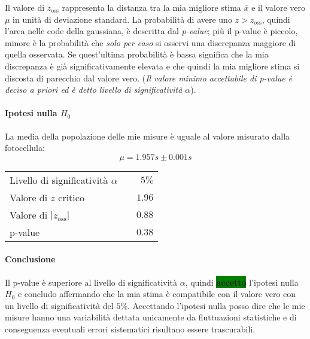 \documentclass{article}
\begin{document}
	
	\noindent
	Il valore di $z_{\text{oss}}$ rappresenta la distanza tra la mia migliore stima $\bar{x}$ e il valore vero $\mu$ in unità di deviazione standard. La probabilità di avere uno $z > z_{\text{oss}}$, quindi l'area nelle code della gaussiana, è descritta dal \textit{p-value}; più il p-value è piccolo, minore è la probabilità che \textit{solo per caso} si osservi una discrepanza maggiore di quella osservata. Se quest'ultima probabilità è bassa significa che la mia discrepanza è già significativamente elevata e che quindi la mia migliore stima si discosta di parecchio dal valore vero.
	(\textit{Il valore minimo accettabile di p-value è deciso a priori ed è detto livello di significatività $\alpha$}).
	
	\paragraph{Ipotesi nulla $H_{0}$} La media della popolazione delle mie misure è uguale al valore misurato dalla fotocellula:
	\[
	\mu = 1.957s \pm 0.001 s
	\]
	
	\begin{table}[H]
		\centering
		\begin{tabular}{lr}
			Livello di significatività $\alpha$		& $ \quad 5\%$  \\
			Valore di $z$ critico     & $\quad 1.96$ \\
			Valore di $|z_{\text{oss}}|$      & $\quad 0.88$ \\
			p-value     & $\quad 0.38$
		\end{tabular}
	\end{table}



	\paragraph{Conclusione}\label{para}  Il p-value è superiore al livello di significatività $\alpha$, quindi \colorbox{green}{\textbf{accetto}} l'ipotesi nulla $H_{0}$ e concludo affermando che la mia stima è compatibile con il valore vero con un livello di significatività del $5\%$. Accettando l'ipotesi nulla posso dire che le mie misure hanno una variabilità dettata unicamente da fluttuazioni statistiche e di conseguenza eventuali  errori sistematici risultano essere trascurabili.
	
\end{document}
